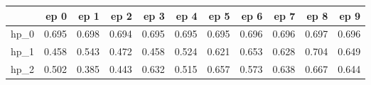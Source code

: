 \begin{tabular}{lrrrrrrrrrr}
\toprule
{} &   ep 0 &   ep 1 &   ep 2 &   ep 3 &   ep 4 &   ep 5 &   ep 6 &   ep 7 &   ep 8 &   ep 9 \\
\midrule
hp\_0 &  0.695 &  0.698 &  0.694 &  0.695 &  0.695 &  0.695 &  0.696 &  0.696 &  0.697 &  0.696 \\
hp\_1 &  0.458 &  0.543 &  0.472 &  0.458 &  0.524 &  0.621 &  0.653 &  0.628 &  0.704 &  0.649 \\
hp\_2 &  0.502 &  0.385 &  0.443 &  0.632 &  0.515 &  0.657 &  0.573 &  0.638 &  0.667 &  0.644 \\
\bottomrule
\end{tabular}
